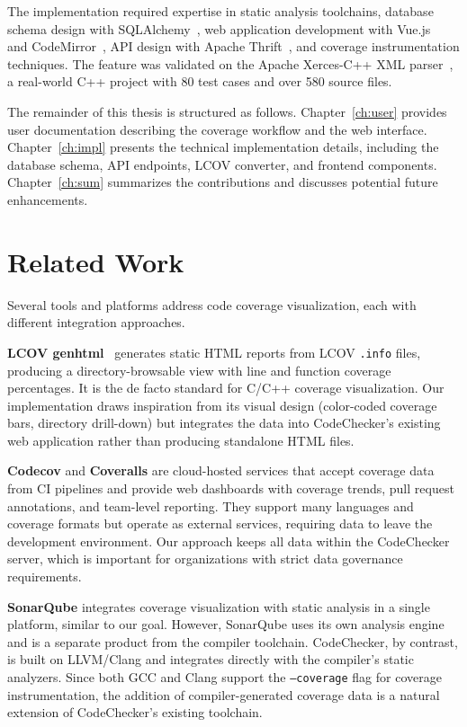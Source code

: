 The implementation required expertise in static analysis toolchains, database schema design with SQLAlchemy~\cite{sqlalchemy}, web application development with Vue.js~\cite{vuejs} and CodeMirror~\cite{codemirror}, API design with Apache Thrift~\cite{thrift}, and coverage instrumentation techniques. The feature was validated on the Apache Xerces-C++ XML parser~\cite{xerces}, a real-world C++ project with 80 test cases and over 580 source files.

The remainder of this thesis is structured as follows. Chapter~\ref{ch:user} provides user documentation describing the coverage workflow and the web interface. Chapter~\ref{ch:impl} presents the technical implementation details, including the database schema, API endpoints, LCOV converter, and frontend components. Chapter~\ref{ch:sum} summarizes the contributions and discusses potential future enhancements.

\section{Related Work}

Several tools and platforms address code coverage visualization, each with different integration approaches.

\textbf{LCOV genhtml}~\cite{lcov} generates static HTML reports from LCOV \texttt{.info} files, producing a directory-browsable view with line and function coverage percentages. It is the de facto standard for C/C++ coverage visualization. Our implementation draws inspiration from its visual design (color-coded coverage bars, directory drill-down) but integrates the data into CodeChecker's existing web application rather than producing standalone HTML files.

\textbf{Codecov} and \textbf{Coveralls} are cloud-hosted services that accept coverage data from CI pipelines and provide web dashboards with coverage trends, pull request annotations, and team-level reporting. They support many languages and coverage formats but operate as external services, requiring data to leave the development environment. Our approach keeps all data within the CodeChecker server, which is important for organizations with strict data governance requirements.

\textbf{SonarQube} integrates coverage visualization with static analysis in a single platform, similar to our goal. However, SonarQube uses its own analysis engine and is a separate product from the compiler toolchain. CodeChecker, by contrast, is built on LLVM/Clang and integrates directly with the compiler's static analyzers. Since both GCC and Clang support the \texttt{--coverage} flag for coverage instrumentation, the addition of compiler-generated coverage data is a natural extension of CodeChecker's existing toolchain.

